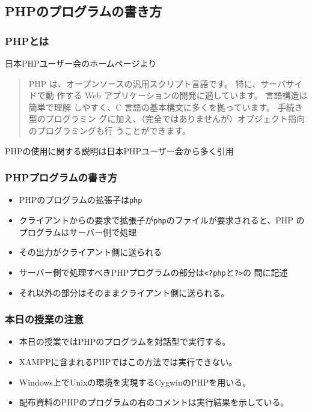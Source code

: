 \documentclass[dvipsk]{beamer}
\begin{document}
\subsection{PHPのプログラムの書き方}
\begin{frame}[containsverbatim]
\frametitle{PHPとは}
日本PHPユーザー会のホームページより

\begin{quotation}
PHP は、オープンソースの汎用スクリプト言語です。 特に、サーバサイドで動
 作する Web アプリケーションの開発に適しています。 言語構造は簡単で理解
 しやすく、C 言語の基本構文に多くを拠っています。 手続き型のプログラミン
 グに加え、（完全ではありませんが）オブジェクト指向のプログラミングも行
 うことができます。
\end{quotation}
PHPの使用に関する説明は日本PHPユーザー会から多く引用
\end{frame}
\begin{frame}[containsverbatim]
\frametitle{PHPプログラムの書き方}
\begin{itemize}
 \item PHPのプログラムの拡張子は\texttt{php}
 \item クライアントからの要求で拡張子が\texttt{php}のファイルが要求されると、PHP
のプログラムはサーバー側で処理
 \item その出力がクライアント側に送られる
 \item サーバー側で処理すべきPHPプログラムの部分は\texttt{<?php}と\texttt{?>}の
間に記述
 \item それ以外の部分はそのままクライアント側に送られる。
\end{itemize}
\end{frame}
\begin{frame}[containsverbatim]
 \frametitle{本日の授業の注意}
 \begin{itemize}
  \item 本日の授業ではPHPのプログラムを対話型で実行する。
  \item XAMPPに含まれるPHPではこの方法では実行できない。
  \item Windows上でUnixの環境を実現するCygwinのPHPを用いる。
  \item 配布資料のPHPのプログラムの右のコメントは実行結果を示している。
 \end{itemize}
\end{frame}
\end{document}
